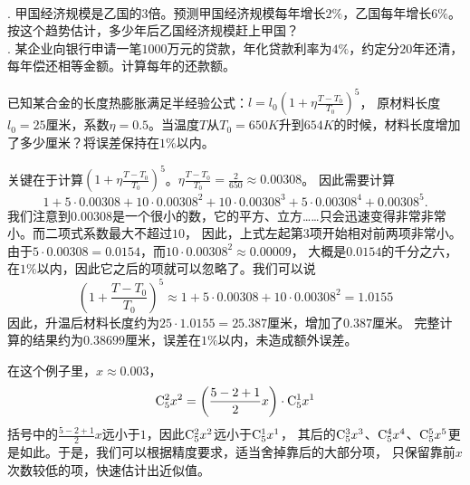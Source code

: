 \documentclass[12pt,UTF8,fontset=none]{ctexbook}
\begin{document}
\begin{xt}
    \mbox{} \\
    . 甲国经济规模是乙国的3倍。预测甲国经济规模每年增长$2\%$，乙国每年增长$6\%$。按这个趋势估计，多少年后乙国经济规模赶上甲国？\\
    . 某企业向银行申请一笔$1000$万元的贷款，年化贷款利率为$4\%$，约定分$20$年还清，每年偿还相等金额。计算每年的还款额。
\end{xt}

\begin{et}
    已知某合金的长度热膨胀满足半经验公式：$l = l_0(1+\eta\frac{T-T_0}{T_0})^5$，
    原材料长度$l_0=25$厘米，系数$\eta=0.5$。当温度$T$从$T_0=650K$升到$654K$的时候，材料长度增加了多少厘米？将误差保持在$1\%$以内。
\end{et}
\begin{so}
    关键在于计算$(1+\eta\frac{T-T_0}{T_0})^5$。$\eta\frac{T-T_0}{T_0} = \frac{2}{650} \approx 0.00308$。
    因此需要计算
    $$ 1 + 5\cdot 0.00308 + 10\cdot 0.00308^2 + 10 \cdot 0.00308^3 + 5 \cdot 0.00308^4 + 0.00308^5. $$
    我们注意到$0.00308$是一个很小的数，它的平方、立方……只会迅速变得非常非常小。而二项式系数最大不超过$10$，
    因此，上式左起第$3$项开始相对前两项非常小。\\
    由于$5 \cdot 0.00308 = 0.0154$，而$10\cdot 0.00308^2 \approx 0.00009$，
    大概是$0.0154$的千分之六，在$1\%$以内，因此它之后的项就可以忽略了。我们可以说
    $$ \left(1+\frac{T-T_0}{T_0}\right)^5 \approx 1 + 5\cdot 0.00308 + 10\cdot 0.00308^2 = 1.0155 $$
    因此，升温后材料长度约为$25\cdot 1.0155 = 25.387$厘米，增加了$0.387$厘米。
    完整计算的结果约为$0.38699$厘米，误差在$1\%$以内，未造成额外误差。   
\end{so}

在这个例子里，$x\approx 0.003$，
$$\mathrm{C}_{5}^{2}x^2 = \left(\frac{5-2+1}{2}x\right)\cdot \mathrm{C}_{5}^{1}x^1$$
括号中的$\frac{5-2+1}{2}x$远小于$1$，因此$\mathrm{C}_{5}^{2}x^2$远小于$\mathrm{C}_{5}^{1}x^1$，
其后的$\mathrm{C}_{5}^{3}x^3$、$\mathrm{C}_{5}^{4}x^4$、$\mathrm{C}_{5}^{5}x^5$更是如此。于是，我们可以根据精度要求，适当舍掉靠后的大部分项，
只保留靠前$x$次数较低的项，快速估计出近似值。
\end{document}
